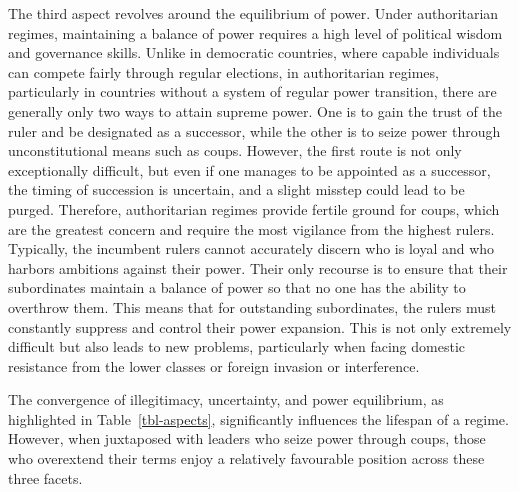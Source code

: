 \documentclass[
  12pt,
  a4paper,
  12pt]{article}
\begin{document}
The third aspect revolves around the equilibrium of power. Under
authoritarian regimes, maintaining a balance of power requires a high
level of political wisdom and governance skills. Unlike in democratic
countries, where capable individuals can compete fairly through regular
elections, in authoritarian regimes, particularly in countries without a
system of regular power transition, there are generally only two ways to
attain supreme power. One is to gain the trust of the ruler and be
designated as a successor, while the other is to seize power through
unconstitutional means such as coups. However, the first route is not
only exceptionally difficult, but even if one manages to be appointed as
a successor, the timing of succession is uncertain, and a slight misstep
could lead to be purged. Therefore, authoritarian regimes provide
fertile ground for coups, which are the greatest concern and require the
most vigilance from the highest rulers. Typically, the incumbent rulers
cannot accurately discern who is loyal and who harbors ambitions against
their power. Their only recourse is to ensure that their subordinates
maintain a balance of power so that no one has the ability to overthrow
them. This means that for outstanding subordinates, the rulers must
constantly suppress and control their power expansion. This is not only
extremely difficult but also leads to new problems, particularly when
facing domestic resistance from the lower classes or foreign invasion or
interference.

The convergence of illegitimacy, uncertainty, and power equilibrium, as
highlighted in Table~\ref{tbl-aspects}, significantly influences the
lifespan of a regime. However, when juxtaposed with leaders who seize
power through coups, those who overextend their terms enjoy a relatively
favourable position across these three facets.
\end{document}
